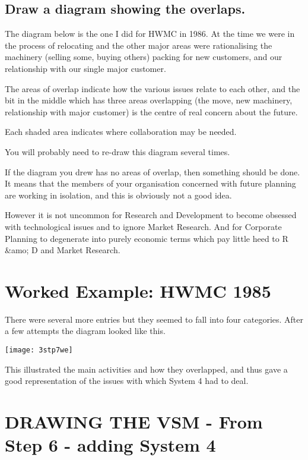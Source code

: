 \subsection*{Draw a diagram showing the overlaps.}
The diagram below is the one I did for HWMC in 1986. At the time we were in the process of relocating and the other major areas were rationalising the machinery (selling some, buying others) packing for new customers, and our relationship with our single major customer.

The areas of overlap indicate how the various issues relate to each other, and the bit in the middle which has three areas overlapping (the move, new machinery, relationship with major customer) is the centre of real concern about the future.

Each shaded area indicates where collaboration may be needed.

You will probably need to re-draw this diagram several times.

If the diagram you drew has no areas of overlap, then something should be done. It means that the members of your organisation concerned with future planning are working in isolation, and this is obviously not a good idea.

However it is not uncommon for Research and Development to become obsessed with technological issues and to ignore Market Research. And for Corporate Planning to degenerate into purely economic terms which pay little heed to R \&amo; D and Market Research.


\section*{Worked Example: HWMC 1985}
There were several more entries but they seemed to fall into four categories. After a few attempts the diagram looked like this.

\begin{center}
\texttt{[image: 3stp7we]}
\end{center}

This illustrated the main activities and how they overlapped, and thus gave a good representation of the issues with which System 4 had to deal.

\section*{DRAWING THE VSM - From Step 6 - adding System 4}

